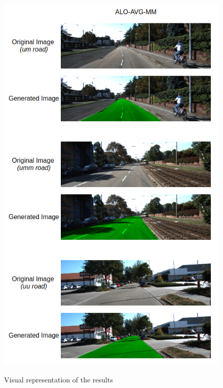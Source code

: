 \begin{figure}
  \caption{Visual representation of the results}
  \centering
  \includegraphics[width=1.\columnwidth]{figures/falreis/visual_representation.png}
  \label{fig:visual_representation}
\end{figure}
